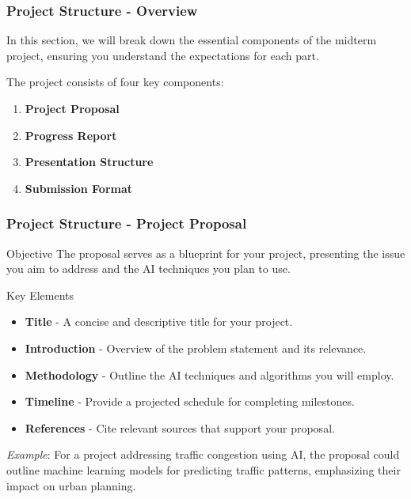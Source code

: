 \documentclass{beamer}
\begin{document}
\begin{frame}[fragile]
    \frametitle{Project Structure - Overview}
    In this section, we will break down the essential components of the midterm project, ensuring you understand the expectations for each part.
    
    The project consists of four key components:
    
    \begin{enumerate}
        \item \textbf{Project Proposal}
        \item \textbf{Progress Report}
        \item \textbf{Presentation Structure}
        \item \textbf{Submission Format}
    \end{enumerate}
\end{frame}

\begin{frame}[fragile]
    \frametitle{Project Structure - Project Proposal}
    \begin{block}{Objective}
        The proposal serves as a blueprint for your project, presenting the issue you aim to address and the AI techniques you plan to use.
    \end{block}

    \begin{block}{Key Elements}
        \begin{itemize}
            \item \textbf{Title} - A concise and descriptive title for your project.
            \item \textbf{Introduction} - Overview of the problem statement and its relevance.
            \item \textbf{Methodology} - Outline the AI techniques and algorithms you will employ.
            \item \textbf{Timeline} - Provide a projected schedule for completing milestones.
            \item \textbf{References} - Cite relevant sources that support your proposal.
        \end{itemize}
    \end{block}

    \textit{Example}: For a project addressing traffic congestion using AI, the proposal could outline machine learning models for predicting traffic patterns, emphasizing their impact on urban planning.
\end{frame}
\end{document}
